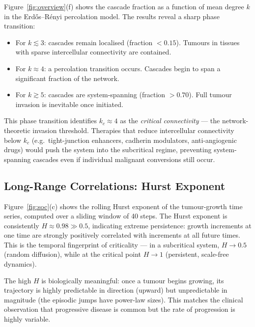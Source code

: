 \documentclass[12pt,a4paper]{article}
\begin{document}
Figure~\ref{fig:overview}(f) shows the cascade fraction as a function of mean
degree $k$ in the Erd\H{o}s--R\'{e}nyi percolation model.  The results reveal
a sharp phase transition:
\begin{itemize}[leftmargin=1.5em]
  \item For $k \lesssim 3$: cascades remain localised (fraction $< 0.15$).
        Tumours in tissues with sparse intercellular connectivity are contained.
  \item For $k \approx 4$: a percolation transition occurs.  Cascades begin
        to span a significant fraction of the network.
  \item For $k \gtrsim 5$: cascades are system-spanning (fraction $> 0.70$).
        Full tumour invasion is inevitable once initiated.
\end{itemize}
This phase transition identifies $k_c \approx 4$ as the \emph{critical
connectivity} --- the network-theoretic invasion threshold.  Therapies that
reduce intercellular connectivity below $k_c$ (e.g.\ tight-junction enhancers,
cadherin modulators, anti-angiogenic drugs) would push the system into the
subcritical regime, preventing system-spanning cascades even if individual
malignant conversions still occur.

\subsection{Long-Range Correlations: Hurst Exponent}

Figure~\ref{fig:soc}(c) shows the rolling Hurst exponent of the tumour-growth
time series, computed over a sliding window of 40 steps.  The Hurst exponent
is consistently $H \approx 0.98 \gg 0.5$, indicating extreme persistence:
growth increments at one time are strongly positively correlated with
increments at all future times.  This is the temporal fingerprint of
criticality --- in a subcritical system, $H \to 0.5$ (random diffusion), while
at the critical point $H \to 1$ (persistent, scale-free dynamics).

The high $H$ is biologically meaningful: once a tumour begins growing, its
trajectory is highly predictable in direction (upward) but unpredictable in
magnitude (the episodic jumps have power-law sizes).  This matches the clinical
observation that progressive disease is common but the rate of progression is
highly variable.
\end{document}
